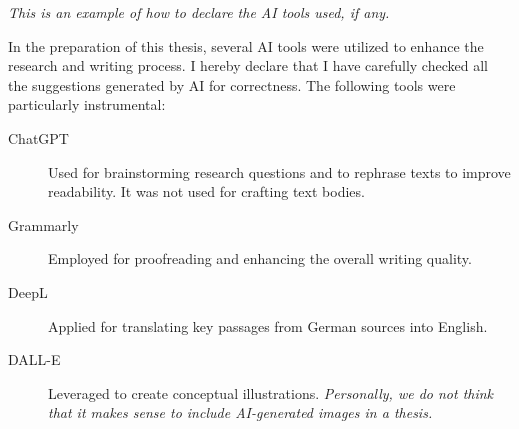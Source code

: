 \emph{This is an example of how to declare the AI tools used, if any.}

In the preparation of this thesis, several AI tools were utilized to enhance the research and writing process.
I hereby declare that I have carefully checked all the suggestions generated by AI for correctness.
The following tools were particularly instrumental:

\begin{description}
    \item[ChatGPT] Used for brainstorming research questions and to rephrase texts to improve readability. It was not used for crafting text bodies.
    \item[Grammarly] Employed for proofreading and enhancing the overall writing quality.
    \item[DeepL] Applied for translating key passages from German sources into English.
    \item[DALL-E] Leveraged to create conceptual illustrations. \emph{Personally, we do not think that it makes sense to include AI-generated images in a thesis.}
\end{description}

